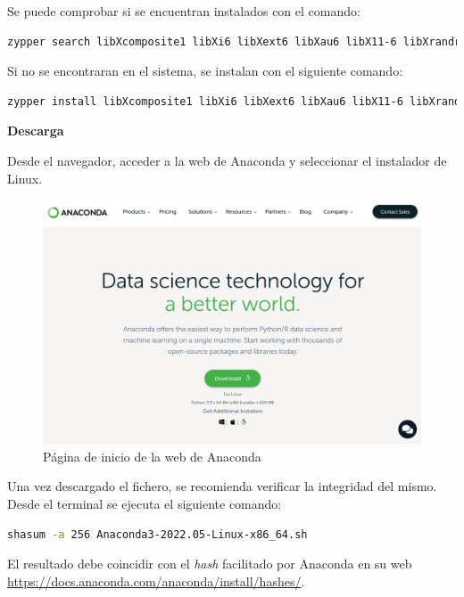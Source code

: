 \documentclass[../main.tex]{subfiles}
\begin{document}
Se puede comprobar si se encuentran instalados con el comando:

\begin{lstlisting}[language=bash]
	zypper search libXcomposite1 libXi6 libXext6 libXau6 libX11-6 libXrandr2 libXrender1 libXss1 libXtst6 libXdamage1 libXcursor1 libxcb1 libasound2  libX11-xcb1 Mesa-libGL1 Mesa-libEGL1
\end{lstlisting}

Si no se encontraran en el sistema, se instalan con el siguiente comando:

\begin{lstlisting}[language=bash]
	zypper install libXcomposite1 libXi6 libXext6 libXau6 libX11-6 libXrandr2 libXrender1 libXss1 libXtst6 libXdamage1 libXcursor1 libxcb1 libasound2  libX11-xcb1 Mesa-libGL1 Mesa-libEGL1
\end{lstlisting}

\textbf{Descarga}

Desde el navegador, acceder a la web de Anaconda y seleccionar el instalador de Linux.

\begin{figure}[h]
	\centering
	\includegraphics[width=0.7\linewidth]{../images/anaconda-install-01}
	\caption{Página de inicio de la web de Anaconda \cite{anaconda2022web}}
	\label{fig:anaconda-install-01}
\end{figure}

Una vez descargado el fichero, se recomienda verificar la integridad del mismo. Desde el terminal se ejecuta el siguiente comando:

\begin{lstlisting}[language=bash]
	shasum -a 256 Anaconda3-2022.05-Linux-x86_64.sh
\end{lstlisting}

El resultado debe coincidir con el \textit{hash} facilitado por Anaconda en su web \url{https://docs.anaconda.com/anaconda/install/hashes/}.
\end{document}
